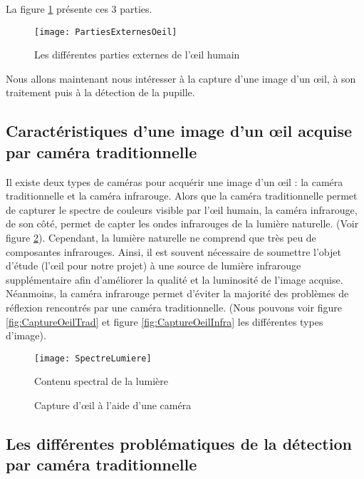 La figure \ref{fig:PartiesExternesOeil} présente ces 3 parties.
\begin{figure}[h]
  \centering
  \texttt{[image: PartiesExternesOeil]}
  \caption{Les différentes parties externes de l'œil humain}
  \label{fig:PartiesExternesOeil}
\end{figure}

Nous allons maintenant nous intéresser à la capture d’une image d’un œil, à son traitement puis à la détection de la pupille.

\subsection{Caractéristiques d’une image d’un œil acquise par caméra traditionnelle}

Il existe deux types de caméras pour acquérir une image d’un œil : la caméra traditionnelle et la caméra infrarouge. Alors que la caméra traditionnelle permet de capturer le spectre de couleurs visible par l’œil humain, la caméra infrarouge, de son côté, permet de capter les ondes infrarouges de la lumière naturelle. (Voir figure \ref{fig:SpectreLumiere}). Cependant, la lumière naturelle ne comprend que très peu de composantes infrarouges. Ainsi, il est souvent nécessaire de soumettre l’objet d’étude (l’œil pour notre projet) à une source de lumière infrarouge supplémentaire afin d’améliorer la qualité et la luminosité de l’image acquise. Néanmoins, la caméra infrarouge permet d’éviter la majorité des problèmes de réflexion rencontrés par une caméra traditionnelle. (Nous pouvons voir figure \ref{fig:CaptureOeilTrad} et figure \ref{fig:CaptureOeilInfra} les différentes types d’image).

\begin{figure}[h]
  \centering
  \texttt{[image: SpectreLumiere]}
  \caption{Contenu spectral de la lumière}
  \label{fig:SpectreLumiere}
\end{figure}

\begin{figure}[!h] 
\centering
{}
\quad 
{}
\caption{Capture d’œil à l’aide d’une caméra} 
\end{figure}

\subsection{Les différentes problématiques de la détection par caméra traditionnelle}

